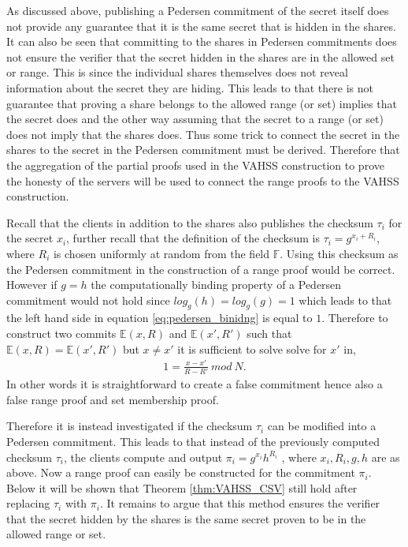 As discussed above, publishing a Pedersen commitment of the secret itself does not provide any guarantee that it is the same secret that is hidden in the shares. It can also be seen that committing to the shares in Pedersen commitments does not ensure the verifier that the secret hidden in the shares are in the allowed set or range. This is since the individual shares themselves does not reveal information about the secret they are hiding. This leads to that there is not guarantee that proving a share belongs to the allowed range (or set) implies that the secret does and the other way assuming that the secret to a range (or set) does not imply that the shares does. Thus some trick to connect the secret in the shares to the secret in the Pedersen commitment must be derived. Therefore  that the aggregation of the partial proofs used in the VAHSS construction to prove the honesty of the servers will be used to connect the range proofs to the VAHSS construction.

Recall that the clients in addition to the shares also publishes the checksum $\tau_i$ for the secret $x_i$, further recall that the definition of the checksum is  $\tau_i=g^{x_i+R_i}$, where $R_i$ is chosen uniformly at random from the field $\mathds{F}$.  Using this checksum as the Pedersen commitment in the construction of a range proof would be correct. However if $g=h$ the computationally binding property of a Pedersen commitment would not hold since $log_g(h)=log_g(g)=1$ which leads to that the left hand side in equation \eqref{eq:pedersen_binidng} is equal to $1$. Therefore to construct two commits $\mathds{E}(x,R)$ and $\mathds{E}(x',R')$ such that $\mathds{E}(x,R) = \mathds{E}(x',R')$ but $x\neq x'$ it is sufficient to solve solve for $x'$ in, 
\begin{align*}
1 = \frac{x-x'}{R-R'}\:mod \:N.
\end{align*}
In other words it is straightforward to create a false commitment hence also a false range proof and set membership proof.

Therefore it is instead investigated if the checksum $\tau_i$ can be modified into a Pedersen commitment. This leads to that instead of the previously computed checksum $\tau_i$,  the clients compute and output $\pi_i=g^{x_i}h^{R_i}$ , where $x_i,R_i,g,h$ are as above. Now a range proof can easily be constructed for the commitment $\pi_i$. Below it will be shown that Theorem \ref{thm:VAHSS_CSV} still hold after replacing $\tau_i$ with $\pi_i$. It remains to argue that this method ensures the verifier that the secret hidden by the shares is the same secret proven to be in the allowed range or set. 

